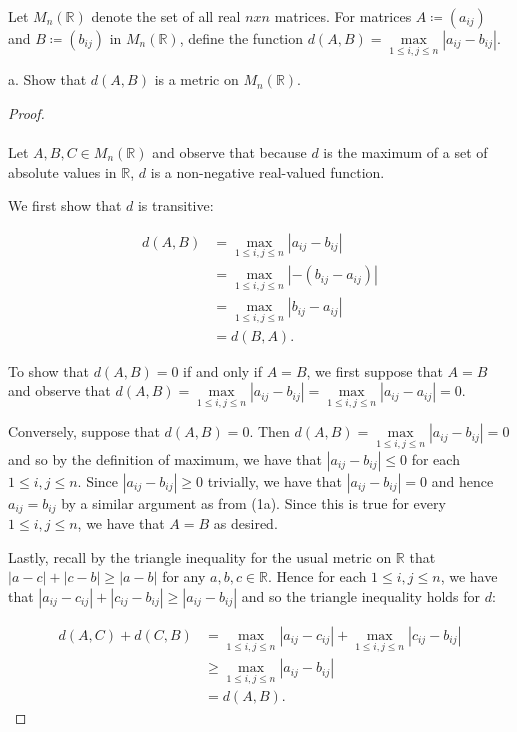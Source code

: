 Let $M_n(\mathbb{R})$ denote the set of all real $n x n$ matrices. For matrices
$A \coloneqq (a_{ij})$ and $B \coloneqq (b_{ij})$ in $M_n{(\mathbb{R})}$, define
the function $d(A, B) = \max\limits_{1 \le i,j \le n}{|a_{ij} - b_{ij}|}$.

a.  Show that $d(A, B)$ is a metric on $M_n(\mathbb{R})$. \ \\

    \begin{proof}\ \\\\
        Let $A, B, C \in M_n(\mathbb{R})$ and observe that because $d$ is the maximum of a set of absolute values in
        $\mathbb{R}$, $d$ is a non-negative real-valued function.
        
        We first show that $d$ is transitive:

        \begin{align*}
            d(A, B) &= \max\limits_{1 \le i,j \le n}{|a_{ij} - b_{ij}|} \\
                    &= \max\limits_{1 \le i,j \le n}{|-(b_{ij} - a_{ij})|} \\
                    &= \max\limits_{1 \le i,j \le n}{|b_{ij} - a_{ij}|} \\
                    &= d(B, A). 
        \end{align*}

        To show that $d(A, B) = 0$ if and only if $A = B$, we first suppose that $A = B$ and observe that
        $d(A, B) = \max\limits_{1 \le i,j \le n}{|a_{ij} - b_{ij}|} = \max\limits_{1 \le i,j \le n}{|a_{ij} - a_{ij}|} = 0$.
        
        Conversely, suppose that $d(A, B) = 0$. Then $d(A, B) = \max\limits_{1 \le i,j \le n}{|a_{ij} - b_{ij}|} = 0$
        and so by the definition of maximum, we have that $|a_{ij} - b_{ij}| \le 0$ for each $1 \le i, j \le n$. Since
        $|a_{ij} - b_{ij}| \ge 0$ trivially, we have that $|a_{ij} - b_{ij}| = 0$ and hence $a_{ij} = b_{ij}$ by a
        similar argument as from (1a). Since this is true for every $1 \le i, j \le n$, we have that $A = B$ as
        desired.
        
        Lastly, recall by the triangle inequality for the usual metric on $\mathbb{R}$ that 
        $|a - c| + |c - b| \ge |a - b|$ for any $a, b, c \in \mathbb{R}$. Hence for each $1 \le i, j \le n$, we have
        that $|a_{ij} - c_{ij}| + |c_{ij} - b_{ij}| \ge |a_{ij} - b_{ij}|$ and so the triangle inequality holds for $d$:

        \begin{align*}
            d(A, C) + d(C, B) &= \max\limits_{1 \le i,j \le n}{|a_{ij} - c_{ij}|} + \max\limits_{1 \le i,j \le n}{|c_{ij} - b_{ij}|} \\
                              &\ge \max\limits_{1 \le i,j \le n}{|a_{ij} - b_{ij}|} \\
                              &= d(A, B).
        \end{align*}
    \end{proof}

